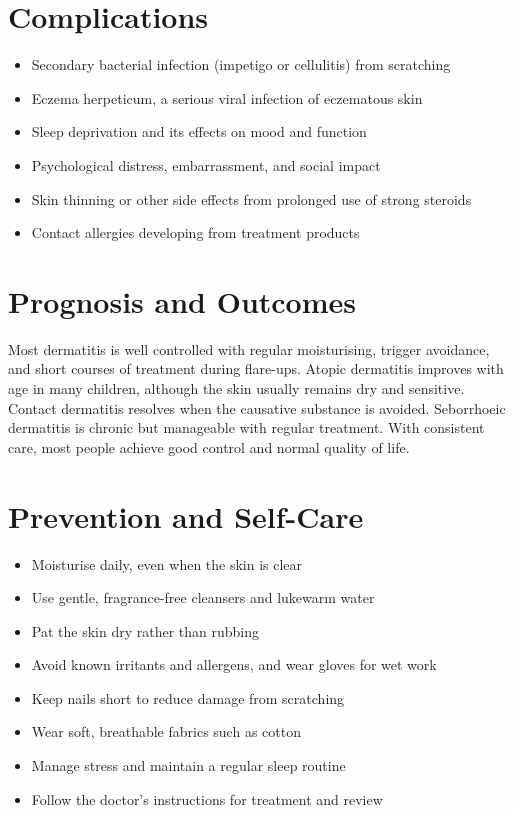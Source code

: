 \section*{Complications}
\begin{itemize}
    \item Secondary bacterial infection (impetigo or cellulitis) from scratching
    \item Eczema herpeticum, a serious viral infection of eczematous skin
    \item Sleep deprivation and its effects on mood and function
    \item Psychological distress, embarrassment, and social impact
    \item Skin thinning or other side effects from prolonged use of strong steroids
    \item Contact allergies developing from treatment products
\end{itemize}

\section*{Prognosis and Outcomes}
Most dermatitis is well controlled with regular moisturising, trigger avoidance, and short courses of treatment during flare-ups. Atopic dermatitis improves with age in many children, although the skin usually remains dry and sensitive. Contact dermatitis resolves when the causative substance is avoided. Seborrhoeic dermatitis is chronic but manageable with regular treatment. With consistent care, most people achieve good control and normal quality of life.

\section*{Prevention and Self-Care}
\begin{itemize}
    \item Moisturise daily, even when the skin is clear
    \item Use gentle, fragrance-free cleansers and lukewarm water
    \item Pat the skin dry rather than rubbing
    \item Avoid known irritants and allergens, and wear gloves for wet work
    \item Keep nails short to reduce damage from scratching
    \item Wear soft, breathable fabrics such as cotton
    \item Manage stress and maintain a regular sleep routine
    \item Follow the doctor's instructions for treatment and review
\end{itemize}

